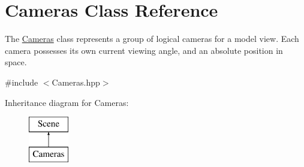 \hypertarget{class_cameras}{\section{Cameras Class Reference}
\label{class_cameras}
}


The \hyperlink{class_cameras}{Cameras} class represents a group of logical cameras for a model view. Each camera possesses its own current viewing angle, and an absolute position in space.  




{\ttfamily \#include $<$Cameras.\-hpp$>$}

Inheritance diagram for Cameras\-:\begin{figure}[H]
\begin{center}
\leavevmode
\includegraphics[height=2.000000cm]{class_cameras}
\end{center}
\end{figure}
